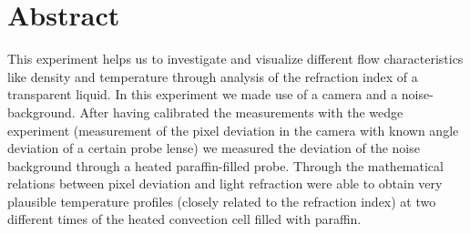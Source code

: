 



 \setcounter{tocdepth}{2}
 \tableofcontents



 \listoffigures %
 \cleardoublepage



\chapter*{Abstract}

This experiment helps us to investigate and visualize different flow characteristics like density and temperature through analysis of the refraction index of a transparent liquid. In this experiment we made use of a camera and a noise-background. After having calibrated the measurements with the wedge experiment (measurement of the pixel deviation in the camera with known angle deviation of a certain probe lense) we measured the deviation of the noise background through a heated paraffin-filled probe. Through the mathematical relations between pixel deviation and light refraction were able to obtain very plausible temperature profiles (closely related to the refraction index) at two different times of the heated convection cell filled with paraffin. 

